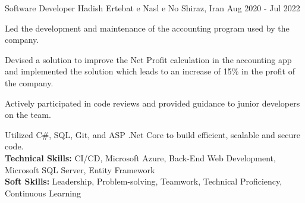 

\begin{cventries}

    \cventry
    {Software Developer} %
    {Hadish Ertebat e Nasl e No} %
    {Shiraz, Iran} %
    {Aug 2020 - Jul 2022} %
    {
      \begin{cvitems} %
        \item {Led the development and maintenance of the accounting program used by the company.}
        \item {Devised a solution to improve the Net Profit calculation in the accounting app and implemented the solution which leads to an increase of 15\% in the profit of the company.}
        \item {Actively participated in code reviews and provided guidance to junior developers on the team.}
        \item {Utilized C\#, SQL, Git, and ASP .Net Core to build efficient, scalable and secure code.
        \\\textbf{Technical Skills:} CI/CD, Microsoft Azure, Back-End Web Development, Microsoft SQL Server, Entity Framework
        \\\textbf{Soft Skills:} Leadership, Problem-solving, Teamwork, Technical Proficiency, Continuous Learning}
      \end{cvitems}
    }


\end{cventries}
